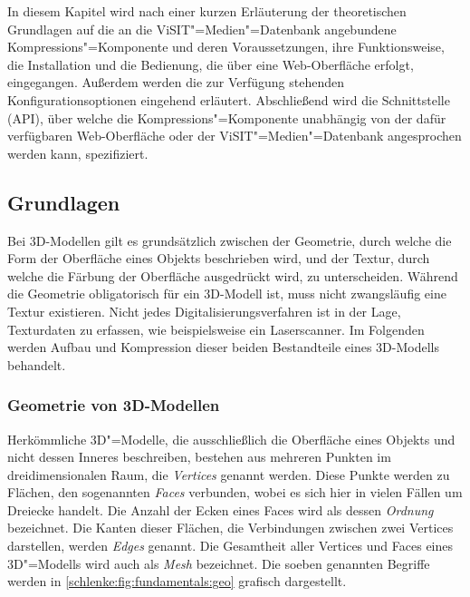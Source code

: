 In diesem Kapitel wird nach einer kurzen Erläuterung der theoretischen Grundlagen auf die an die ViSIT"=Medien"=Datenbank angebundene Kompressions"=Komponente und deren Voraussetzungen, ihre Funktionsweise, die Installation und die Bedienung, die über eine Web-Oberfläche erfolgt, eingegangen. Außerdem werden die zur Verfügung stehenden Konfigurationsoptionen eingehend erläutert. Abschließend wird die Schnittstelle (API), über welche die Kompressions"=Komponente unabhängig von der dafür verfügbaren Web-Oberfläche oder der ViSIT"=Medien"=Datenbank angesprochen werden kann, spezifiziert.

\subsection{Grundlagen}

Bei 3D-Modellen gilt es grundsätzlich zwischen der Geometrie, durch welche die Form der Oberfläche eines Objekts beschrieben wird, und der Textur, durch welche die Färbung der Oberfläche ausgedrückt wird, zu unterscheiden. Während die Geometrie obligatorisch für ein 3D-Modell ist, muss nicht zwangsläufig eine Textur existieren. Nicht jedes Digitalisierungsverfahren ist in der Lage, Texturdaten zu erfassen, wie beispielsweise ein Laserscanner. Im Folgenden werden Aufbau und Kompression dieser beiden Bestandteile eines 3D-Modells behandelt.

\subsubsection{Geometrie von 3D-Modellen}
\label{schlenke:chp:fundamentalsGeometry}

Herkömmliche 3D"=Modelle, die ausschließlich die Oberfläche eines Objekts und nicht dessen Inneres beschreiben, bestehen aus mehreren Punkten im dreidimensionalen Raum, die \emph{Vertices} genannt werden. Diese Punkte werden zu Flächen, den sogenannten \emph{Faces} verbunden, wobei es sich hier in vielen Fällen um Dreiecke handelt. Die Anzahl der Ecken eines Faces wird als dessen \emph{Ordnung} bezeichnet. Die Kanten dieser Flächen, die Verbindungen zwischen zwei Vertices darstellen, werden \emph{Edges} genannt. Die Gesamtheit aller Vertices und Faces eines 3D"=Modells wird auch als \emph{Mesh} bezeichnet. Die soeben genannten Begriffe werden in \autoref{schlenke:fig:fundamentals:geo} grafisch dargestellt.

